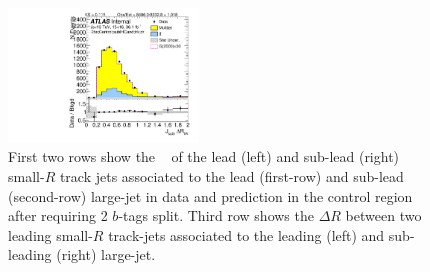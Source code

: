 \begin{figure}[htbp!]
\begin{center}
\includegraphics[width=0.45\textwidth,angle=-90]{figures/boosted/Control/b77_TwoTag_split_Control_sublHCand_trk_dr.pdf}
  \caption{First two rows show the \pt~ of the lead (left) and sub-lead (right) small-$R$ track jets associated to the lead (first-row) and sub-lead (second-row) large-\R jet in data and prediction in the control region after requiring 2 $b$-tags split. Third row shows the $\Delta R$ between two leading small-$R$ track-jets associated to the leading (left) and sub-leading (right) large-\R jet.  }
  \label{fig:boosted-2bs-control-ak2}
\end{center}
\end{figure}


